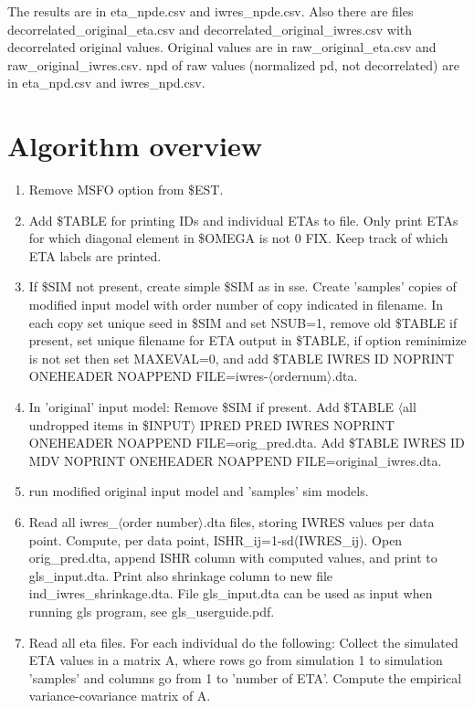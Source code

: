 The results are in eta\_npde.csv and iwres\_npde.csv. Also there are files decorrelated\_original\_eta.csv and decorrelated\_original\_iwres.csv with decorrelated original values. Original values are in raw\_original\_eta.csv and raw\_original\_iwres.csv. npd of raw values (normalized pd, not decorrelated) are in eta\_npd.csv and iwres\_npd.csv.

\section{Algorithm overview}

\begin{enumerate}
\item Remove MSFO option from \$EST.
\item Add \$TABLE for printing IDs and individual ETAs to file. Only print ETAs for which diagonal element in \$OMEGA is not 0 FIX. Keep track of which ETA labels are printed.
\item If \$SIM not present, create simple \$SIM as in sse. Create 'samples' copies of modified input model with order number of copy indicated in filename. In each copy set unique seed in \$SIM and set NSUB=1, remove old \$TABLE if present, set unique filename for ETA output in \$TABLE, if option reminimize is not set then set MAXEVAL=0, and add \$TABLE IWRES ID NOPRINT ONEHEADER NOAPPEND FILE=iwres-$\langle$ordernum$\rangle$.dta. 
\item In 'original' input model: Remove \$SIM if present. Add \$TABLE $\langle$all undropped items in \$INPUT$\rangle$ IPRED PRED IWRES NOPRINT ONEHEADER NOAPPEND FILE=orig\_pred.dta. Add \$TABLE IWRES ID MDV NOPRINT ONEHEADER NOAPPEND FILE=original\_iwres.dta. 
\item run modified original input model and 'samples' sim models.
\item Read all iwres\_$\langle$order number$\rangle$.dta files, storing IWRES values per data point. Compute, per data point, ISHR\_ij=1-sd(IWRES\_ij). Open orig\_pred.dta, append ISHR column with computed values, and print to gls\_input.dta. Print also shrinkage column to new file ind\_iwres\_shrinkage.dta. File gls\_input.dta can be used as input when running gls program, see gls\_userguide.pdf.
\item Read all eta files. For each individual do the following: Collect the simulated ETA values in a matrix A, where rows go from simulation 1 to simulation 'samples' and columns go from 1 to 'number of ETA'. Compute the empirical variance-covariance matrix of A. 

\end{enumerate}
